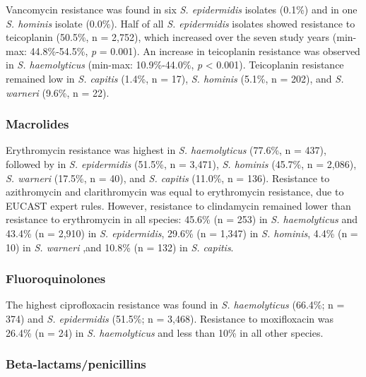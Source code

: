 \documentclass[
]{book}
\begin{document}
Vancomycin resistance was found in six \emph{S. epidermidis} isolates (0.1\%) and in one \emph{S. hominis} isolate (0.0\%). Half of all \emph{S. epidermidis} isolates showed resistance to teicoplanin (50.5\%, n = 2,752), which increased over the seven study years (min-max: 44.8\%-54.5\%, \emph{p} = 0.001). An increase in teicoplanin resistance was observed in \emph{S. haemolyticus} (min-max: 10.9\%-44.0\%, \emph{p} \textless{} 0.001). Teicoplanin resistance remained low in \emph{S. capitis} (1.4\%, n = 17), \emph{S. hominis} (5.1\%, n = 202), and \emph{S. warneri} (9.6\%, n = 22).

\hypertarget{macrolides}{%
\subsubsection{Macrolides}\label{macrolides}}

Erythromycin resistance was highest in \emph{S. haemolyticus} (77.6\%, n = 437), followed by in \emph{S. epidermidis} (51.5\%, n = 3,471), \emph{S. hominis} (45.7\%, n = 2,086), \emph{S. warneri} (17.5\%, n = 40), and \emph{S. capitis} (11.0\%, n = 136). Resistance to azithromycin and clarithromycin was equal to erythromycin resistance, due to EUCAST expert rules. However, resistance to clindamycin remained lower than resistance to erythromycin in all species: 45.6\% (n = 253) in \emph{S. haemolyticus} and 43.4\% (n = 2,910) in \emph{S. epidermidis}, 29.6\% (n = 1,347) in \emph{S. hominis}, 4.4\% (n = 10) in \emph{S. warneri} ,and 10.8\% (n = 132) in \emph{S. capitis}.

\hypertarget{fluoroquinolones}{%
\subsubsection{Fluoroquinolones}\label{fluoroquinolones}}

The highest ciprofloxacin resistance was found in \emph{S. haemolyticus} (66.4\%; n = 374) and \emph{S. epidermidis} (51.5\%; n = 3,468). Resistance to moxifloxacin was 26.4\% (n = 24) in \emph{S. haemolyticus} and less than 10\% in all other species.

\hypertarget{beta-lactamspenicillins}{%
\subsubsection{Beta-lactams/penicillins}\label{beta-lactamspenicillins}}
\end{document}
